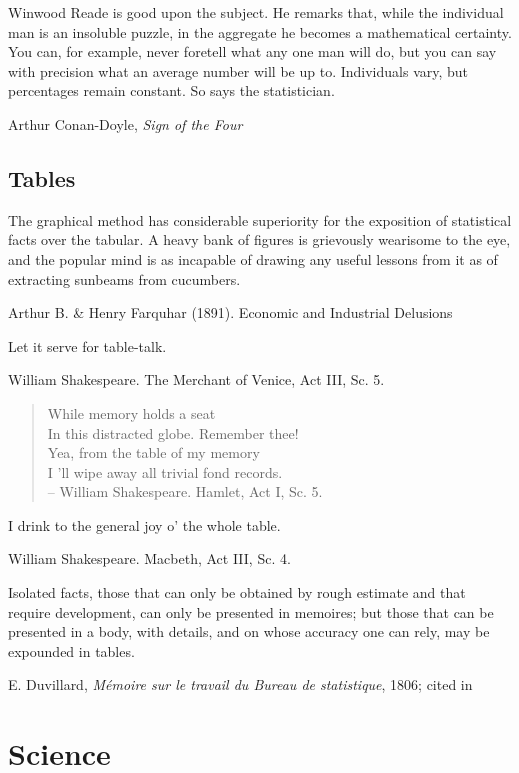 \epigraph{Winwood Reade is good upon the subject. He remarks that, while the individual man is an insoluble puzzle, in the aggregate he becomes a mathematical certainty. You can, for example, never foretell what any one man will do, but you can say with precision what an average number will be up to. Individuals vary, but percentages remain constant. So says the statistician.}{Arthur Conan-Doyle, \emph{Sign of the Four}}


\subsection{Tables}

\epigraph{The graphical method has considerable superiority for the exposition of statistical facts over the tabular. A heavy bank of figures is grievously wearisome to the eye, and the popular mind is as incapable of drawing any useful lessons from it as of extracting sunbeams from cucumbers.}{Arthur B. \& Henry Farquhar (1891). Economic and Industrial Delusions \citet[p. 55]{FaquharFaquhar:1891}}


\epigraph{Let it serve for table-talk.}{William Shakespeare. The Merchant of Venice, Act III, Sc. 5.}

	\begin{verse}
	While memory holds a seat \\
	In this distracted globe. Remember thee! \\
	Yea, from the table of my memory \\
	I 'll wipe away all trivial fond records. \\
-- William Shakespeare. Hamlet, Act I, Sc. 5.
	\end{verse}

\epigraph{I drink to the general joy o' the whole table.}{William Shakespeare. Macbeth, Act III, Sc. 4.}

\epigraph{Isolated facts, those that can only be obtained by rough estimate and that require development, can only be presented in memoires; but those that can be presented in a body, with details, and on whose accuracy one can rely, may be expounded in tables.}{E. Duvillard, \emph{M{\'e}moire sur le travail du Bureau de statistique}, 1806; cited in \citet[p. 38]{Derosieres:98}}

 





\section{Science}

